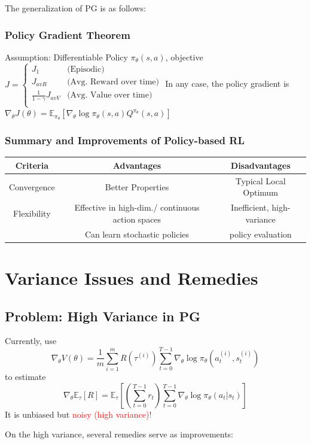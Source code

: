 \documentclass{article}
\begin{document}
The generalization of PG is as follows:
\begin{thmbox}
    \subsubsection*{Policy Gradient Theorem}
    Assumption: Differentiable Policy $\pi_{\theta}(s, a)$, objective $J = 
    \begin{cases}
        J_1 & \text{(Episodic)} \\
        J_{avR} & \text{(Avg. Reward over time)} \\
        \frac{1}{1 - \gamma} J_{avV} & \text{(Avg. Value over time)} \\
    \end{cases}
    $
    In any case, the policy gradient is 
    $\nabla_{\theta} J(\theta) = \mathbb{E}_{\pi_{\theta}} \left[ \nabla_{\theta} \log \pi_{\theta} (s, a) Q^{\pi_{\theta}} (s, a)\right]$
\end{thmbox}

\subsubsection*{Summary and Improvements of Policy-based RL}
\begin{center}
    \begin{tabular}{|c||c|c|}
    \hline
    Criteria & Advantages & Disadvantages \\ \hline
    Convergence & Better Properties & Typical Local Optimum \\ \hline
    Flexibility & Effective in high-dim./ continuous action spaces & Inefficient, high-variance \\ 
    & Can learn stochastic policies & policy evaluation \\ \hline
    \end{tabular}
\end{center}

\section{Variance Issues and Remedies}

\subsection{Problem: High Variance in PG}
\begin{defbox}
    Currently, use
    \begin{equation*}
        \nabla_{\theta} V(\theta) = \frac{1}{m} \sum_{i = 1}^{m} R(\tau^{(i)}) \sum_{t = 0}^{T-1} \nabla_{\theta} \log \pi_{\theta} (a_t^{(i)}, s_t^{(i)})
    \end{equation*}
    to estimate
    \begin{equation*}
        \nabla_{\theta} \mathbb{E}_{\tau} [R] = \mathbb{E}_{\tau} \left[ \left(\sum_{t = 0}^{T-1} r_{t} \right) \sum_{t=0}^{T-1} \nabla_{\theta} \log \pi_{\theta} (a_t | s_t) \right]
    \end{equation*}
    It is unbiased but \textcolor{red}{noisy (high variance)!}
\end{defbox}
On the high variance, several remedies serve as improvements:
\end{document}
